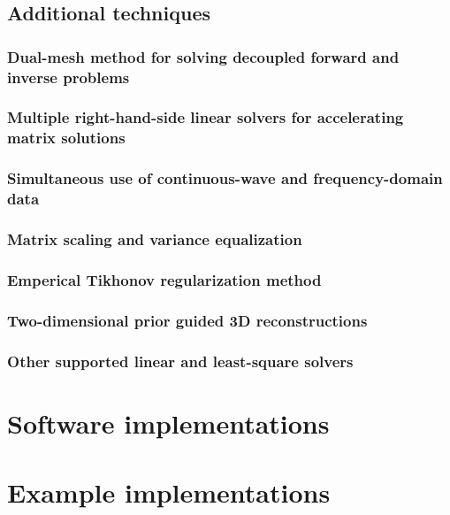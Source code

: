 \documentclass[12pt]{book}               %
\begin{document}
\section{Additional techniques}

\subsection{Dual-mesh method for solving decoupled forward and inverse problems}

\subsection{Multiple right-hand-side linear solvers for accelerating matrix solutions}

\subsection{Simultaneous use of continuous-wave and frequency-domain data}

\subsection{Matrix scaling and variance equalization}

\subsection{Emperical Tikhonov regularization method}

\subsection{Two-dimensional prior guided 3D reconstructions}

\subsection{Other supported linear and least-square solvers}




\chapter{Software implementations}

\chapter{Example implementations}
\end{document}
